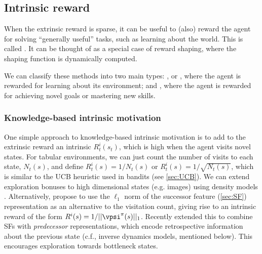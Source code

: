 %



\subsection{Intrinsic reward}
\label{sec:intrinsicReward}
\label{sec:intrinsic}

When the extrinsic reward is sparse,
it can be useful to (also) reward the agent for solving
``generally useful'' tasks,
such as learning about the world.
This is called 
\citep{Aubret2023,Linke2019,Amin2021,Yuan2022,Yuan2024,Colas2022}.
It can be thought of as a special case of reward shaping,
where the shaping function is dynamically computed.

We can classify these methods into two main types:
,
or ,
where the agent is
rewarded for learning about its environment;
and  ,
where the agent is rewarded for achieving novel goals
or mastering new skills.

\subsubsection{Knowledge-based intrinsic motivation}

One simple approach to knowledge-based intrinsic motivation
is to add to the extrinsic reward
an intrinsic 
$R_t^i(s_t)$,
which is high when the agent visits novel states.
For tabular environments, we can just count the number of visits to each state,
$N_t(s)$, and define $R_t^i(s) = 1/N_t(s)$ or
$R_t^i(s) = 1/\sqrt{N_t(s)}$, which is similar to the UCB
heuristic used in bandits (see \cref{sec:UCB}).
We can  extend exploration bonuses  to high dimensional states (e.g. images)
using density models \citep{Bellemare2016}.
Alternatively, \citep{Machado2020} propose to use the $\ell_1$
norm of the successor feature (\cref{sec:SF}) representation
as an alternative to the visitation count, giving rise
to an intrinsic reward of the form
$R^i(s) = 1/||\vpsi^{\pi}(s)||_1$.
Recently \citep{Yu2023} extended this to combine
SFs with {\em predecessor} representations,
which encode retrospective information about the previous state
(c.f., inverse dynamics models, mentioned below).
This encourages exploration towards bottleneck states.

